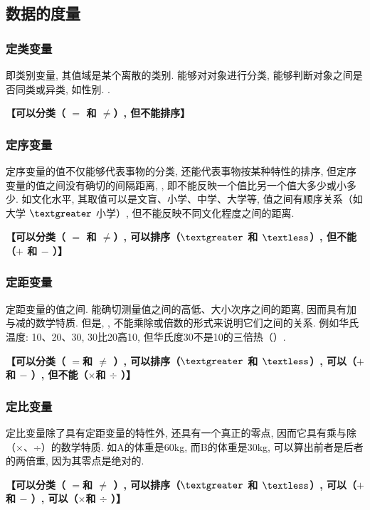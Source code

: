 \subsection{数据的度量}
\subsubsection{定类变量}
即类别变量, 其值域是某个离散的类别. 能够对对象进行分类, 能够判断对象之间是否同类或异类, 如性别. . 

\textbf{【可以分类（ $=$ 和 $\neq$）, 但不能排序】}

\subsubsection{定序变量}
定序变量的值不仅能够代表事物的分类, 还能代表事物按某种特性的排序, 但定序变量的值之间没有确切的间隔距离, , 即不能反映一个值比另一个值大多少或小多少. 如文化水平, 其取值可以是文盲、小学、中学、大学等, 值之间有顺序关系（如大学 $\textgreater$ 小学）, 但不能反映不同文化程度之间的距离. 

\textbf{【可以分类（ $=$ 和 $\neq$）, 可以排序（$\textgreater$ 和 $\textless$）, 但不能（$+$ 和 $-$ ）】}

\subsubsection{定距变量}
定距变量的值之间. 能确切测量值之间的高低、大小次序之间的距离, 因而具有加与减的数学特质. 但是, , 不能乘除或倍数的形式来说明它们之间的关系. 例如华氏温度: 10、20、30, 30比20高10, 但华氏度30不是10的三倍热（）. 

\textbf{【可以分类（ $=$和 $\neq$ ）, 可以排序（$\textgreater$ 和 $\textless$）, 可以（$+$ 和 $-$ ）, 但不能（$\times$和 $\div$ ）】}

\subsubsection{定比变量}
定比变量除了具有定距变量的特性外, 还具有一个真正的零点, 因而它具有乘与除（×、÷）的数学特质. 如A的体重是60kg, 而B的体重是30kg, 可以算出前者是后者的两倍重, 因为其零点是绝对的. 

\textbf{【可以分类（ $=$和 $\neq$ ）, 可以排序（$\textgreater$ 和 $\textless$）, 可以（$+$ 和 $-$ ）, 可以（$\times$和 $\div$ ）】}

